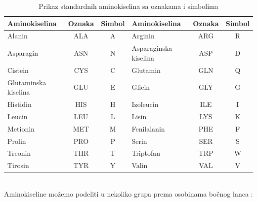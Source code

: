 \begin{table}
	\centering
	\begin{tabular}{|lcc|lcc|}
		\hline
		Aminokiselina & Oznaka & Simbol & Aminokiselina & Oznaka & Simbol \\
		\hline
		Alanin & ALA & A & Arginin & ARG & R  \\
		Asparagin & ASN & N & Asparaginska kiselina & ASP & D \\
		Cistein & CYS & C & Glutamin & GLN & Q  \\
		Glutaminska kiselina & GLU & E & Glicin & GLY & G  \\
		Histidin & HIS & H & Izoleucin & ILE & I  \\
		Leucin & LEU & L & Lisin & LYS & K  \\
		Metionin & MET & M & Fenilalanin & PHE & F  \\
		Prolin & PRO & P & Serin & SER & S  \\
		Treonin & THR & T & Triptofan & TRP & W  \\
		Tirosin & TYR & Y & Valin & VAL & V \\
		\hline             
	\end{tabular}
	\caption{Prikaz standardnih aminokiselina sa oznakama i simbolima}
	\label{tab: aminoacids}
\end{table}

~ \\
\noindent Aminokiseline možemo podeliti u nekoliko grupa prema osobinama bočnog lanca \cite{biochemestry5, biohUdz, bioinf}:

